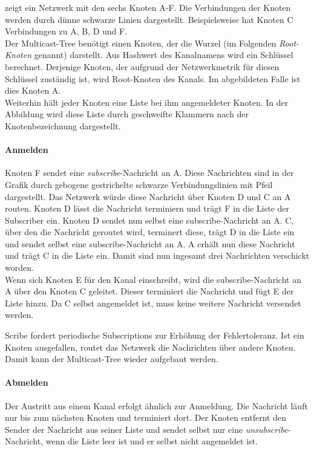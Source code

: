  zeigt ein Netzwerk mit den sechs Knoten A-F. Die Verbindungen der Knoten werden durch dünne schwarze Linien dargestellt. Beispielsweise hat Knoten C Verbindungen zu A, B, D und F.\\
Der Multicast-Tree benötigt einen Knoten, der die Wurzel (im Folgenden \emph{Root-Knoten} genannt) darstellt. Aus Hashwert des Kanalnamens wird ein Schlüssel berechnet. Derjenige Knoten, der aufgrund der Netzwerkmetrik für diesen Schlüssel zuständig ist, wird Root-Knoten des Kanals. Im abgebildeten Falle ist dies Knoten A.\\
Weiterhin hält jeder Knoten eine Liste bei ihm angemeldeter Knoten. In der Abbildung wird diese Liste durch geschweifte Klammern nach der Knotenbezeichnung dargestellt.

\paragraph*{Anmelden}
Knoten F sendet eine \emph{subscribe}-Nachricht an A. Diese Nachrichten sind in der Grafik durch gebogene gestrichelte schwarze Verbindungslinien mit Pfeil dargestellt. Das Netzwerk würde diese Nachricht über Knoten D und C an A routen. Knoten D lässt die Nachricht terminiern und trägt F in die Liste der Subscriber ein. Knoten D sendet nun selbst eine subscribe-Nachricht an A. C, über den die Nachricht geroutet wird, terminert diese, trägt D in die Liste ein und sendet selbst eine subscribe-Nachricht an A. A erhält nun diese Nachricht und trägt C in die Liste ein. Damit sind nun ingesamt drei Nachrichten verschickt worden.\\
Wenn sich Knoten E für den Kanal einschreibt, wird die subscribe-Nachricht an A über den Knoten C geleitet. Dieser terminiert die Nachricht und fügt E der Liste hinzu. Da C selbst angemeldet ist, muss keine weitere Nachricht versendet werden.

Scribe fordert periodische Subscriptions zur Erhöhung der Fehlertoleranz. Ist ein Knoten ausgefallen, routet das Netzwerk die Nachrichten über andere Knoten. Damit kann der Multicast-Tree wieder aufgebaut werden.

\paragraph*{Abmelden}
Der Austritt aus einem Kanal erfolgt ähnlich zur Anmeldung. Die Nachricht läuft nur bis zum nächsten Knoten und terminiert dort. Der Knoten entfernt den Sender der Nachricht aus seiner Liste und sendet selbst nur eine \emph{unsubscribe}-Nachricht, wenn die Liste leer ist und er selbst nicht angemeldet ist.

